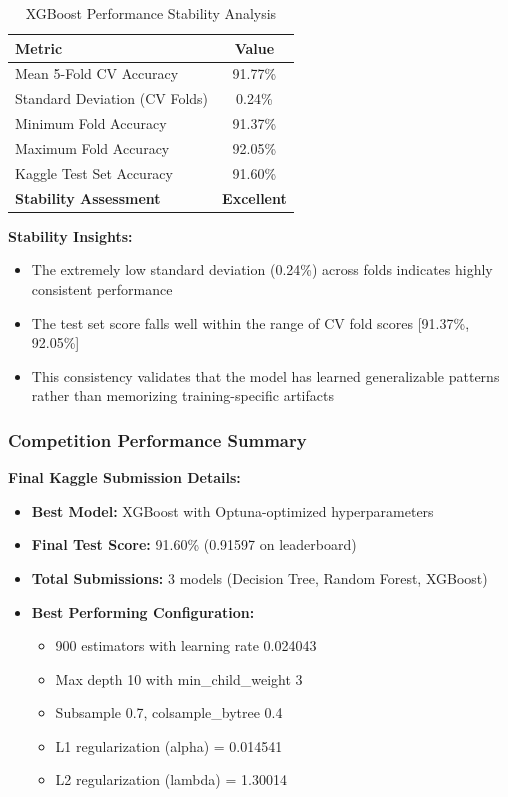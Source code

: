 \documentclass[12pt,a4paper]{article}
\begin{document}
\begin{table}[H]
\centering
\caption{XGBoost Performance Stability Analysis}
\begin{tabular}{lc}
\toprule
\textbf{Metric} & \textbf{Value} \\
\midrule
Mean 5-Fold CV Accuracy & 91.77\% \\
Standard Deviation (CV Folds) & 0.24\% \\
Minimum Fold Accuracy & 91.37\% \\
Maximum Fold Accuracy & 92.05\% \\
Kaggle Test Set Accuracy & 91.60\% \\
\midrule
\textbf{Stability Assessment} & \textbf{Excellent} \\
\bottomrule
\end{tabular}
\end{table}

\textbf{Stability Insights:}
\begin{itemize}
    \item The extremely low standard deviation (0.24\%) across folds indicates highly consistent performance
    \item The test set score falls well within the range of CV fold scores [91.37\%, 92.05\%]
    \item This consistency validates that the model has learned generalizable patterns rather than memorizing training-specific artifacts
\end{itemize}

\subsubsection{Competition Performance Summary}

\textbf{Final Kaggle Submission Details:}
\begin{itemize}
    \item \textbf{Best Model:} XGBoost with Optuna-optimized hyperparameters
    \item \textbf{Final Test Score:} 91.60\% (0.91597 on leaderboard)
    \item \textbf{Total Submissions:} 3 models (Decision Tree, Random Forest, XGBoost)
    \item \textbf{Best Performing Configuration:}
    \begin{itemize}
        \item 900 estimators with learning rate 0.024043
        \item Max depth 10 with min\_child\_weight 3
        \item Subsample 0.7, colsample\_bytree 0.4
        \item L1 regularization (alpha) = 0.014541
        \item L2 regularization (lambda) = 1.30014
    \end{itemize}
\end{itemize}
\end{document}
